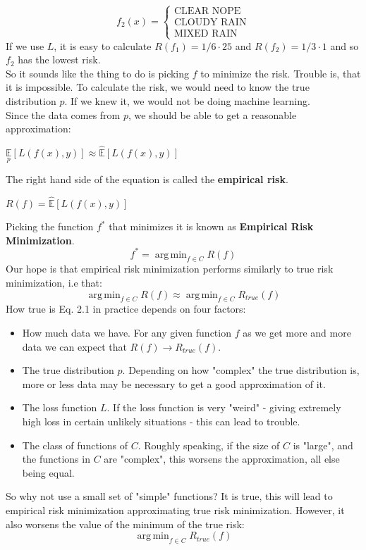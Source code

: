 \documentclass[twoside]{article}
\DeclareMathOperator*{\argmin}{arg\,min}
\begin{document}
\begin{equation*}
    f_2(x) = \begin{cases}
        \text{CLEAR NOPE} \\
        \text{CLOUDY RAIN} \\
        \text{MIXED RAIN} 
    \end{cases}
\end{equation*}
If we use $L$, it is easy to calculate $R(f_1) = 1/6\cdot25$ and $R(f_2) = 1/3\cdot1$ and so $f_2$ has the lowest risk.\\
So it sounds like the thing to do is picking $f$ to minimize the risk. Trouble is, that it is impossible.
To calculate the risk, we would need to know the true distribution $p$. If we knew it, we would not be doing machine learning.\\
Since the data comes from $p$, we should be able to get a reasonable approximation:
\begin{center}
    $\underset{p}{\mathbb{E}}[L(f(x), y)] \approx \hat{\mathbb{E}}[L(f(x), y)]$
\end{center}
The right hand side of the equation is called the \textbf{empirical risk}.
\begin{center}
    $R(f) = \hat{\mathbb{E}}[L(f(x), y)]$
\end{center}
Picking the function $f^*$ that minimizes it is known as \textbf{Empirical Risk Minimization}.
\begin{equation*}
    f^* = \argmin_{f \in C} R(f)
\end{equation*}
Our hope is that empirical risk minimization performs similarly to true risk minimization, i.e that:
\begin{equation}
    \argmin_{f \in C} R(f) \approx \argmin_{f \in C} R_{true}(f)
\end{equation}
\newpage
How true is Eq. 2.1 in practice depends on four factors:
\begin{itemize}
    \item How much data we have. For any given function $f$ as we get more and more data we can expect that $R(f) \to R_{true}(f)$.
    \item The true distribution $p$. Depending on how "complex" the true distribution is, more or less data may be necessary to get a good approximation of it.
    \item The loss function $L$. If the loss function is very "weird" - giving extremely high loss in certain unlikely situations - this can lead to trouble.
    \item The class of functions of $C$. Roughly speaking, if the size of $C$ is "large", and the functions in $C$ are "complex", this worsens the approximation, all else being equal.
\end{itemize}
So why not use a small set of "simple" functions? It is true, this will lead to empirical risk minimization approximating true risk minimization. However, it also worsens the value of the minimum of the true risk:
\begin{equation*}
    \argmin_{f \in C} R_{true}(f)
\end{equation*}
\end{document}
